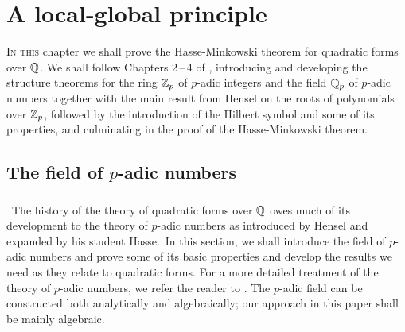 \chapter{A local-global principle}
\label{chap:local-global-principle}

{\scshape In this} chapter we shall prove the Hasse-Minkowski theorem for quadratic forms over \(\mathbb{Q}\). We shall follow Chapters 2\,--\,4 of \cite{serre2012course}, introducing and developing the structure theorems for the ring \(\mathbb{Z}_p\) of \(p\)-adic integers and the field \(\mathbb{Q}_p\) of \(p\)-adic numbers together with the main result from Hensel on the roots of polynomials over \(\mathbb{Z}_p\), followed by the introduction of the Hilbert symbol and some of its properties, and culminating in the proof of the Hasse-Minkowski theorem.

\section{The field of \(p\)-adic numbers}

\subsection{}~The history of the theory of quadratic forms over \(\mathbb{Q}\) owes much of its development to the theory of \(p\)-adic numbers as introduced by Hensel and expanded by his student Hasse.\,\cite{hasse1922uber,hensel1913zahlentheorie} In this section, we shall introduce the field of \(p\)-adic numbers and prove some of its basic properties and develop the results we need as they relate to quadratic forms. For a more detailed treatment of the theory of \(p\)-adic numbers, we refer the reader to \cite{gouvea1997p,koblitzp}. The \(p\)-adic field can be constructed both analytically and algebraically; our approach in this paper shall be mainly algebraic.\label{sec:field-of-p-adic-numbers}


